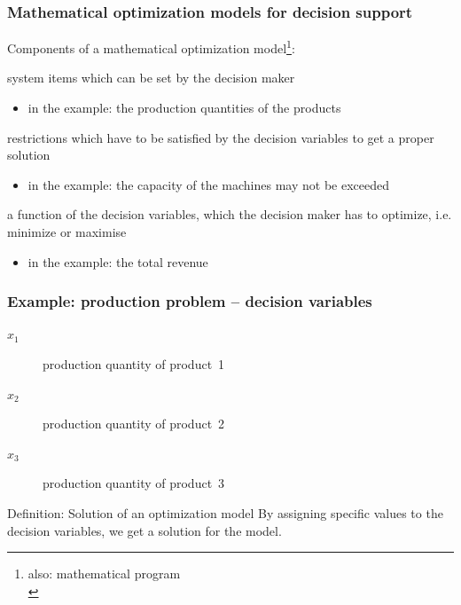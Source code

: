 \begin{frame}
 \frametitle{Mathematical optimization models for decision support}
 Components of a mathematical optimization model\footnote{also: mathematical program\\}:
 \begin{description}\footnotesize
  \item[decision variables] system items which can be set by the decision maker 
  \begin{itemize}
   \item in the example: the production quantities of the products
  \end{itemize}
  \item[constraints] restrictions which have to be satisfied by the decision variables to get a proper solution
  \begin{itemize}
   \item in the example: the capacity of the machines may not be exceeded
  \end{itemize}  
  \item[objective function] a function of the decision variables, which the decision maker has to optimize, i.e. minimize or maximise
  \begin{itemize}
   \item in the example: the total revenue
  \end{itemize}  
 \end{description}
\end{frame}

\begin{frame}
 \frametitle{Example: production problem -- decision variables}
 \begin{description}
  \item[$x_1$] production quantity of product~1
  \item[$x_2$] production quantity of product~2
  \item[$x_3$] production quantity of product~3
 \end{description}
 
 \begin{block}{Definition: Solution of an optimization model}
  By assigning specific values to the decision variables, we get a solution for the model.
 \end{block}
\end{frame}


